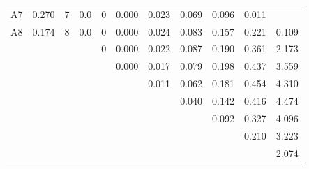 \begin{table}[H]
\begin{tabular}{ccccccccccc}
    A7        & 0.270                      & 7         & 0.0 & 0   & 0.000   & 0.023             & 0.069             & 0.096             & 0.011            &        \\
    A8        & 0.174                      & 8         & 0.0 & 0   & 0.000   & 0.024             & 0.083             & 0.157             & 0.221            & 0.109  \\
    \textbf{} &                            &           &     & 0   & 0.000   & 0.022             & 0.087             & 0.190             & 0.361            & 2.173  \\
    \textbf{} &                            &           &     &     & 0.000   & 0.017             & 0.079             & 0.198             & 0.437            & 3.559  \\
              & \textbf{}                  &           &     &     &         & 0.011             & 0.062             & 0.181             & 0.454            & 4.310  \\
              & \textbf{}                  &           &     &     &         &                   & 0.040             & 0.142             & 0.416            & 4.474  \\
              & \textbf{}                  &           &     &     &         &                   &                   & 0.092             & 0.327            & 4.096  \\
              & \textbf{}                  &           &     &     &         &                   &                   &                   & 0.210            & 3.223  \\
              & \textbf{}                  &           &     &     &         &                   &                   &                   &                  & 2.074 \\
    \bottomrule
    \end{tabular}
    \end{table}

